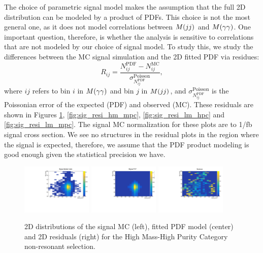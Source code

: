 The choice of parametric signal model makes the assumption that the full 2D distribution can be modeled by a product of PDFs. 
This choice is not the most general one, as it does not model correlations between $M(jj)$ and $M(\gamma\gamma)$. 
One important question, therefore, is whether the analysis is sensitive to correlations that are not modeled by our choice of signal model. 
To study this, we study the differences between the MC signal simulation and the 2D fitted PDF via residues:
\begin{equation}
R_{ij} = \frac{N^{\textrm{PDF}}_{ij} - N^{\textrm{MC}}_{ij}}{\sigma_{N^{\textrm{PDF}}_{ij}}^{\textrm{Poisson}}},
\end{equation}
where $ij$ refers to bin $i$ in $M(\gamma\gamma)$ and bin $j$ in $M(jj)$, and $\sigma_{N^{\textrm{PDF}}_{ij}}^{\textrm{Poisson}}$ is the Poissonian error of the expected (PDF) and observed (MC).  
These residuals are shown in Figures \ref{fig:sig_resi_hm_hpc}, \ref{fig:sig_resi_hm_mpc}, \ref{fig:sig_resi_lm_hpc} and \ref{fig:sig_resi_lm_mpc}.
The signal MC normalization for these plots are to 1/fb signal cross section. 
We see no structures in the residual plots in the region where the signal is expected, therefore, we assume that the PDF product modeling is good enough given the statistical precision we have. 

\begin{figure}[thb]
  \centering
\includegraphics[width=0.3\textwidth]{figures/sec-signals/SignalResiduals/h_mc_HM_cat0}\hfil
\includegraphics[width=0.3\textwidth]{figures/sec-signals/SignalResiduals/h_pd_HM_cat0}\hfil
\includegraphics[width=0.3\textwidth]{figures/sec-signals/SignalResiduals/h_re_HM_cat0}\hfil
  \caption{2D distributions of the signal MC (left), fitted PDF model (center) and 2D residuals (right) for the High Mass-High Purity Category non-resonant selection.}
  \label{fig:sig_resi_hm_hpc}
\end{figure}


